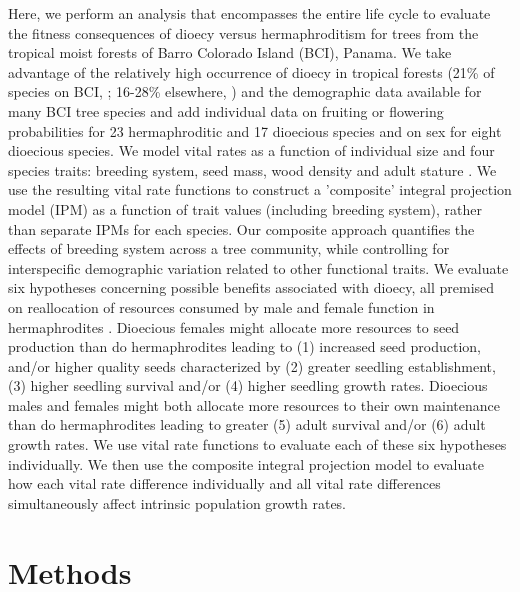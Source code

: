 \documentclass[b5paper,justified]{tufte-book} %
\begin{document}
\begin{fullwidth}
Here, we perform an analysis that encompasses the entire life cycle to evaluate the fitness consequences of dioecy versus hermaphroditism for trees from the tropical moist forests of Barro Colorado Island (BCI), Panama. We take advantage of the relatively high occurrence of dioecy in tropical forests (21\% of species on BCI, \citealt{Croat1978}; 16-28\% elsewhere, \citealt{Opler1978, Zapata1978, Bawa1980}) and the demographic data available for many BCI tree species \citep{Hubbell1983, Hubbell1992, Wright2005a, Muller-Landau2008, Comita2010} and add individual data on fruiting or flowering probabilities for 23 hermaphroditic and 17 dioecious species and on sex for eight dioecious species. We model vital rates as a function of individual size and four species traits: breeding system, seed mass, wood density and adult stature \citep{Poorter2008, Wright2010, Visser2016}. We use the resulting vital rate functions to construct a 'composite' integral projection model (IPM) as a function of trait values (including breeding system), rather than separate IPMs for each species. Our composite approach quantifies the effects of breeding system across a tree community, while controlling for interspecific demographic variation related to other functional traits. We evaluate six hypotheses concerning possible benefits associated with dioecy, all premised on reallocation of resources consumed by male and female function in hermaphrodites \citep{Heilbuth2001,  Barot2004, Vamosi2008, Queenborough2009}. Dioecious females might allocate more resources to seed production than do hermaphrodites leading to (1) increased seed production, and/or higher quality seeds characterized by (2) greater seedling establishment, (3) higher seedling survival and/or (4) higher seedling growth rates. Dioecious males and females might both allocate more resources to their own maintenance than do hermaphrodites leading to greater (5) adult survival and/or (6) adult growth rates. We use vital rate functions to evaluate each of these six hypotheses individually. We then use the composite integral projection model to evaluate how each vital rate difference individually and all vital rate differences simultaneously affect intrinsic population growth rates.

\section{Methods}


\end{fullwidth}
\end{document}
